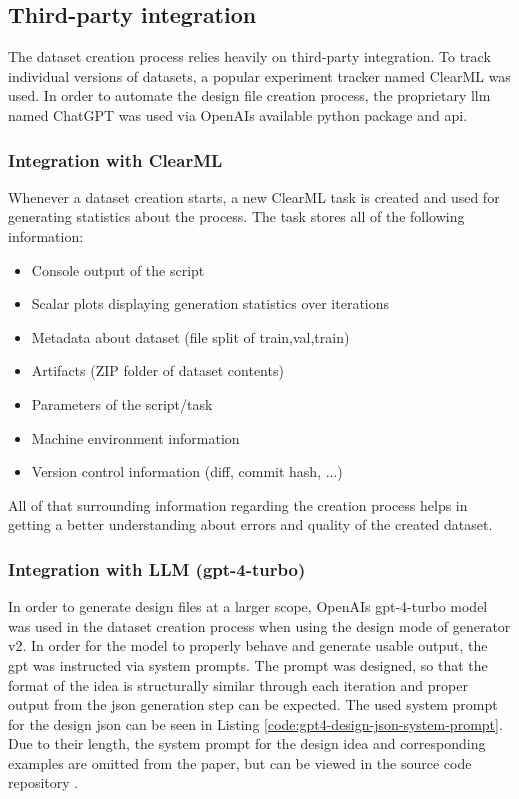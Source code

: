 \documentclass[Bachelor, BIC, english, fhCitStyle, IEEE]{BASE/twbook} %
\newcommand{\nocontentsline}[3]{}
\newcommand{\hidsubsubsection}[1]{\bgroup\let\addcontentsline=\nocontentsline\subsubsection{#1}\egroup}
\begin{document}
\subsection{Third-party integration} %
The dataset creation process relies heavily on third-party integration. To track individual versions of datasets, a popular experiment tracker named ClearML was used. In order to automate the design file creation process, the proprietary \ac{llm} named ChatGPT was used via OpenAIs available python package and \ac{api}.
\hidsubsubsection{Integration with ClearML}
Whenever a dataset creation starts, a new ClearML task is created and used for generating statistics about the process. The task stores all of the following information:
\begin{itemize}
    \item Console output of the script
    \item Scalar plots displaying generation statistics over iterations
    \item Metadata about dataset (file split of train,val,train)
    \item Artifacts (ZIP folder of dataset contents)
    \item Parameters of the script/task
    \item Machine environment information
    \item Version control information (diff, commit hash, ...)
\end{itemize}
All of that surrounding information regarding the creation process helps in getting a better understanding about errors and quality of the created dataset.
\hidsubsubsection{Integration with LLM (gpt-4-turbo)}
In order to generate design files at a larger scope, OpenAIs gpt-4-turbo model was used in the dataset creation process when using the design mode of generator v2. In order for the model to properly behave and generate usable output, the \ac{gpt} was instructed via system prompts.
The prompt was designed, so that the format of the idea is structurally similar through each iteration and proper output from the \ac{json} generation step can be expected. The used system prompt for the design \ac{json} can be seen in Listing \ref{code:gpt4-design-json-system-prompt}. Due to their length, the system prompt for the design idea and corresponding examples are omitted from the paper, but can be viewed in the source code repository \autocite{UidetectorSrcGenerate}.
\end{document}
